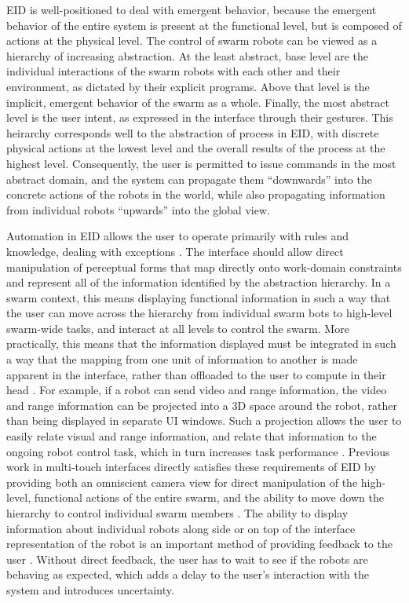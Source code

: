 \documentclass[]{article}
\begin{document}
EID is well-positioned to deal with emergent behavior, because the emergent behavior of the entire system is present at the functional level, but is composed of actions at the physical level.  
The control of swarm robots can be viewed as a hierarchy of increasing abstraction. 
At the least abstract, base level are the individual interactions of the swarm robots with each other and their environment, as dictated by their explicit programs. 
Above that level is the implicit, emergent behavior of the swarm as a whole. 
Finally, the most abstract level is the user intent, as expressed in the interface through their gestures. 
This heirarchy corresponds well to the abstraction of process in EID, with discrete physical actions at the lowest level and the overall results of the process at the highest level. 
Consequently, the user is permitted to issue commands in the most abstract domain, and the system can propagate them ``downwards'' into the concrete actions of the robots in the world, while also propagating information from individual robots ``upwards'' into the global view. 

Automation in EID allows the user to operate primarily with rules and knowledge, dealing with exceptions \cite{vicente2002ecological}.
The interface should allow direct manipulation of perceptual forms that map directly onto work-domain constraints and represent all of the information identified by the abstraction hierarchy. 
In a swarm context, this means displaying functional information in such a way that the user can move across the hierarchy from individual swarm bots to high-level swarm-wide tasks, and interact at all levels to control the swarm. 
More practically, this means that the information displayed must be integrated in such a way that the mapping from one unit of information to another is made apparent in the interface, rather than offloaded to the user to compute in their head \cite{yanco2004beyond}. 
For example, if a robot can send video and range information, the video and range information can be projected into a 3D space around the robot, rather than being displayed in separate UI windows.
Such a projection allows the user to easily relate visual and range information, and relate that information to the ongoing robot control task, which in turn increases task performance \cite{ricks2004ecological}.
Previous work in multi-touch interfaces directly satisfies these requirements of EID by providing both an omniscient camera view for direct manipulation of the high-level, functional actions of the entire swarm, and the ability to move down the hierarchy to control individual swarm members \cite{Micire:2009:ANG:1731903.1731912}.
The ability to display information about individual robots along side or on top of the interface representation of the robot is an important method of providing feedback to the user \cite{Kato:2009:MIC:1520340.1520500}. 
Without direct feedback, the user has to wait to see if the robots are behaving as expected, which adds a delay to the user's interaction with the system and introduces uncertainty.
\end{document}
